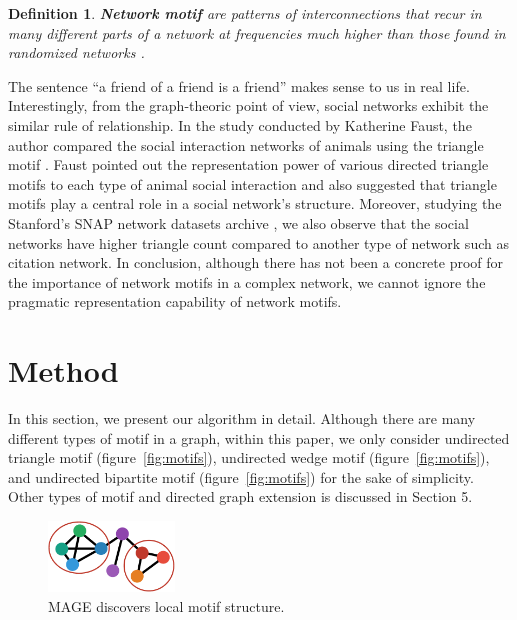 \documentclass[letterpaper]{article}
\newtheorem{ntdef}{Definition}
\begin{document}
            \begin{ntdef}
                \textbf{Network motif} are patterns of interconnections that recur in many different
                parts of a network at frequencies much higher than those found in randomized networks
                \cite{motifblockmilo}.
            \end{ntdef}

            The sentence ``a friend of a friend is a friend'' makes sense to us in real life. Interestingly,
            from the graph-theoric point of view, social networks exhibit the similar rule of relationship.
            In the study conducted by Katherine Faust, the author compared the social interaction 
            networks of animals using the triangle motif \cite{comsocialnetwork}. Faust pointed
            out the representation power of various directed triangle motifs to each type of animal social
            interaction and also suggested that triangle motifs play a central role in a social network's
            structure. Moreover, studying the Stanford's SNAP network datasets archive \cite{snap}, 
            we also observe that the social networks have higher triangle count compared to another type of 
            network such as citation network. In conclusion, although there has not been a concrete proof 
            for the importance of network motifs in a complex network, we cannot ignore the pragmatic 
            representation capability of network motifs.

    \section{Method}

        In this section, we present our algorithm in detail. Although there are many different types of motif
        in a graph, within this paper, we only consider undirected triangle motif (figure~\ref{fig:motifs}),
        undirected wedge motif (figure~\ref{fig:motifs}), and undirected bipartite motif 
        (figure~\ref{fig:motifs}) for the sake of simplicity. Other types of motif and directed graph
        extension is discussed in Section 5.

        \begin{figure}
            \centering
            \includegraphics[width=0.3\textwidth]{fig5_mage}
            \caption{MAGE discovers local motif structure.}
            \label{fig:n2v}
        \end{figure}
\end{document}
